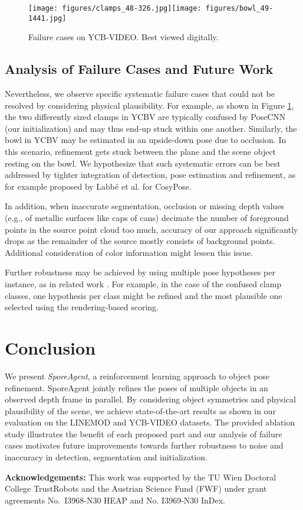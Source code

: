 \documentclass[10pt,twocolumn,letterpaper]{article}
\begin{document}
\begin{figure}
    \centering
    \texttt{[image: figures/clamps\_48-326.jpg]}\texttt{[image: figures/bowl\_49-1441.jpg]}
    \caption{Failure cases on YCB-VIDEO. Best viewed digitally.}
    \label{fig:errors}
\end{figure}

\subsection{Analysis of Failure Cases and Future Work}\label{sec:errors}
Nevertheless, we observe specific systematic failure cases that could not be resolved by considering physical plausibility. For example, as shown in Figure \ref{fig:errors}, the two differently sized clamps in YCBV are typically confused by PoseCNN (our initialization) and may thus end-up stuck within one another. Similarly, the bowl in YCBV may be estimated in an upside-down pose due to occlusion. In this scenario, refinement gets stuck between the plane and the scene object resting on the bowl. We hypothesize that such systematic errors can be best addressed by tighter integration of detection, pose estimation and refinement, as for example proposed by Labb{\'e} et al. \cite{labbe2020cosypose} for CosyPose.

In addition, when inaccurate segmentation, occlusion or missing depth values (e.g., of metallic surfaces like caps of cans) decimate the number of foreground points in the source point cloud too much, accuracy of our approach significantly drops as the remainder of the source mostly consists of background points. Additional consideration of color information might lessen this issue.

Further robustness may be achieved by using multiple pose hypotheses per instance, as in related work \cite{labbe2020cosypose,mitash2018mcts,bauer2020verefine}. For example, in the case of the confused clamp classes, one hypothesis per class might be refined and the most plausible one selected using the rendering-based scoring.


\section{Conclusion}\label{sec:conclusion}
We present \textit{SporeAgent}, a reinforcement learning approach to object pose refinement. SporeAgent jointly refines the poses of multiple objects in an observed depth frame in parallel. By considering object symmetries and physical plausibility of the scene, we achieve state-of-the-art results as shown in our evaluation on the LINEMOD and YCB-VIDEO datasets. The provided ablation study illustrates the benefit of each proposed part and our analysis of failure cases motivates future improvements towards further robustness to noise and inaccuracy in detection, segmentation and initialization.

\textbf{Acknowledgements:} This work was supported by the TU Wien Doctoral College TrustRobots and the Austrian Science Fund (FWF) under grant agreements \mbox{No. I3968-N30} HEAP and No. I3969-N30 InDex.

{\small


}
\end{document}
